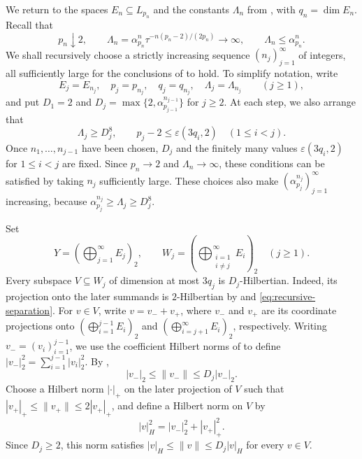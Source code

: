 \documentclass[11pt,a4paper,reqno]{amsart}
\theoremstyle{definition}
\newcommand{\norm}[1]{\lVert #1\rVert}
\numberwithin{equation}{section}
\begin{document}
We return to the spaces $E_n\subseteq L_{p_n}$ and the constants $\Lambda_n$ from , with $q_n=\dim E_n$. Recall that
\begin{equation*}
    p_n\downarrow2,\qquad
    \Lambda_n=\alpha_{p_n}^n\tau^{-n(p_n-2)/(2p_n)}\longrightarrow\infty,
    \qquad \Lambda_n\leq \alpha_{p_n}^n.
\end{equation*}
We shall recursively choose a strictly increasing sequence $(n_j)_{j=1}^{\infty}$ of integers, all sufficiently large for the conclusions of  to hold. To simplify notation, write
\begin{equation*}
    E_j=E_{n_j},\quad p_j=p_{n_j},\quad q_j=q_{n_j},\quad
    \Lambda_j=\Lambda_{n_j}\qquad(j\geq1),
\end{equation*}
and put $D_1=2$ and $D_j=\max\{2,\alpha_{p_{j-1}}^{n_{j-1}}\}$ for $j\geq2$. At each step, we also arrange that
\begin{equation}\label{eq:recursive-separation}
    \Lambda_j\geq D_j^8,
    \qquad p_j-2\leq\varepsilon(3q_i,2)\quad(1\leq i<j).
\end{equation}
Once $n_1,\ldots,n_{j-1}$ have been chosen, $D_j$ and the finitely many values $\varepsilon(3q_i,2)$ for $1\leq i<j$ are fixed. Since $p_n\to2$ and $\Lambda_n\to\infty$, these conditions can be satisfied by taking $n_j$ sufficiently large. These choices also make $(\alpha_{p_j}^{n_j})_{j=1}^{\infty}$ increasing, because $\alpha_{p_j}^{n_j}\geq\Lambda_j\geq D_j^8$.

Set
\begin{equation}\label{eq:constructed-range}
    Y=\left(\bigoplus_{j=1}^{\infty}E_j\right)_2,
    \qquad W_j=\left(\bigoplus_{\substack{i=1\\i\ne j}}^{\infty}E_i\right)_2
    \quad(j\geq1).
\end{equation}
Every subspace $V\subseteq W_j$ of dimension at most $3q_j$ is $D_j$-Hilbertian. Indeed, its projection onto the later summands is $2$-Hilbertian by  and \eqref{eq:recursive-separation}. For $v\in V$, write $v=v_-+v_+$, where $v_-$ and $v_+$ are its coordinate projections onto $(\bigoplus_{i=1}^{j-1}E_i)_2$ and $(\bigoplus_{i=j+1}^{\infty}E_i)_2$, respectively. Writing $v_-=(v_i)_{i=1}^{j-1}$, we use the coefficient Hilbert norms of  to define $|v_-|_2^2=\sum_{i=1}^{j-1}|v_i|_2^2$. By ,
\begin{equation*}
    |v_-|_2\leq\norm{v_-}\leq D_j|v_-|_2.
\end{equation*}
Choose a Hilbert norm $|\cdot|_+$ on the later projection of $V$ such that $|v_+|_+\leq\norm{v_+}\leq2|v_+|_+$, and define a Hilbert norm on $V$ by
\begin{equation*}
    |v|_H^2=|v_-|_2^2+|v_+|_+^2.
\end{equation*}
Since $D_j\geq2$, this norm satisfies $|v|_H\leq\norm v\leq D_j|v|_H$ for every $v\in V$.
\end{document}
